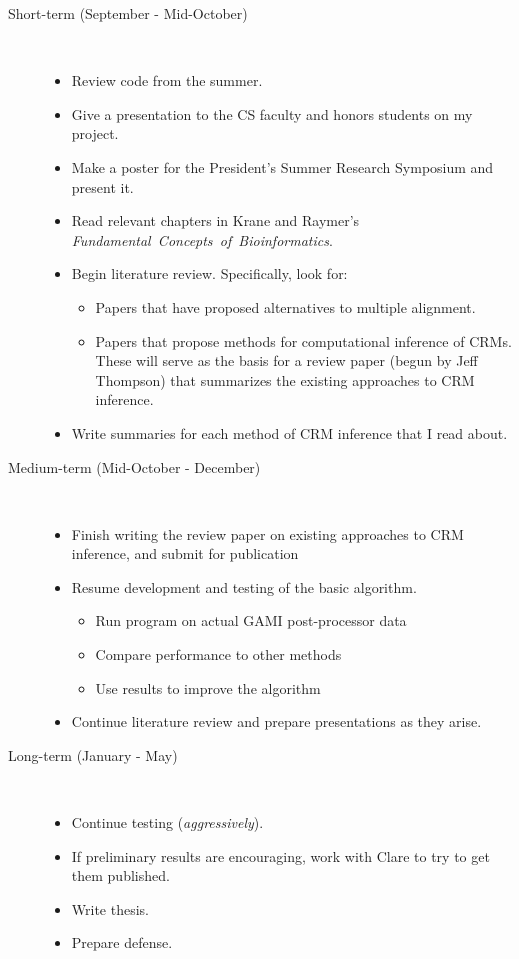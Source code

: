 \documentclass[11pt]{article}
\begin{document}
\begin{description}

\item[Short-term (September - Mid-October)]\
 
\begin{itemize}
\item Review code from the summer.
\item Give a presentation to the CS faculty and honors students on my project.
\item Make a poster for the President's Summer Research Symposium and present it.
\item Read relevant chapters in Krane and Raymer's \mbox{\emph{Fundamental Concepts of Bioinformatics}}.
\item Begin literature review. Specifically, look for:
\begin{itemize}
\item Papers that have proposed alternatives to multiple alignment.
\item Papers that propose methods for computational inference of CRMs. These will serve as the basis for a review paper (begun by Jeff Thompson) that summarizes the existing approaches to CRM inference.
\end{itemize}
\item Write summaries for each method of CRM inference that I read about.
\end{itemize}

\item[Medium-term (Mid-October - December)]\ 

\begin{itemize}
\item Finish writing the review paper on existing approaches to CRM inference, and submit for publication
\item Resume development and testing of the basic algorithm.

\begin{itemize}
\item Run program on actual GAMI post-processor data
\item Compare performance to other methods
\item Use results to improve the algorithm
\end{itemize}

\item Continue literature review and prepare presentations as they arise.
\end{itemize}

\item[Long-term (January - May)]\ 
\begin{itemize}
\item Continue testing (\emph{aggressively}).
\item If preliminary results are encouraging, work with Clare to try to get them published.
\item Write thesis.
\item Prepare defense.
\end{itemize}
\end{description}
\end{document}
